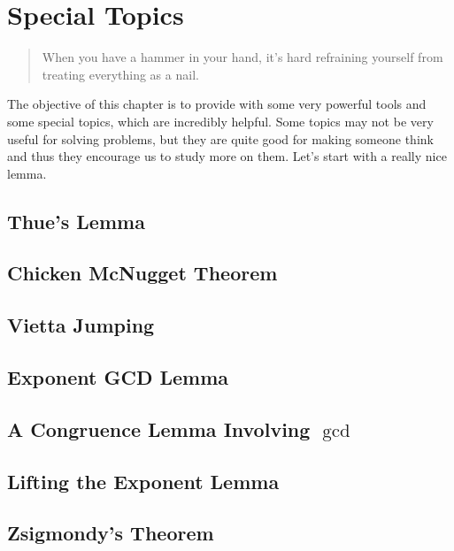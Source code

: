 \chapter{Special Topics}\label{ch:special}

\begin{quote}\ttfamily
	When you have a hammer in your hand, it's hard refraining yourself from treating everything as a nail.
\end{quote}
The objective of this chapter is to provide with some very powerful tools and some special topics, which are incredibly helpful. Some topics may not be very useful for solving problems, but they are quite good for making someone think and thus they encourage us to study more on them. Let's start with a really nice lemma.

\section{Thue's Lemma}


\section{Chicken McNugget Theorem}


\section{Vietta Jumping}


\section{Exponent GCD Lemma}


\section{A Congruence Lemma Involving \texorpdfstring{${\gcd}$}{gcd}}


\section{Lifting the Exponent Lemma}


\section{Zsigmondy's Theorem}



